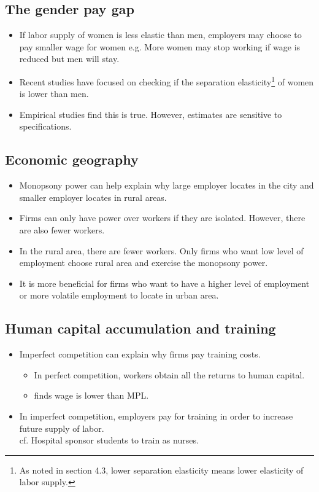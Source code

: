 \documentclass[a4paper, 12pt]{article}
\begin{document}
\subsection{The gender pay gap}
\begin{itemize}
\item If labor supply of women is less elastic than men, employers may choose to pay smaller wage for women e.g. More women may stop working if wage is reduced but men will stay.
\item Recent studies have focused on checking if the separation elasticity\footnote{As noted in section 4.3, lower separation elasticity means lower elasticity of labor supply.} of women is lower than men.
\item  Empirical studies find this is true. However, estimates are sensitive to specifications.
\end{itemize}
\subsection{Economic geography}
\begin{itemize}
\item Monopsony power can help explain why large employer locates in the city and smaller employer locates in rural areas.
\item Firms can only have power over workers if they are isolated. However, there are also fewer workers.
\item In the rural area, there are fewer workers. Only firms who want low level of employment choose rural area and exercise the monopsony power.
\item It is more beneficial for firms who want to  have a higher level of employment or more volatile employment to locate in urban area.
\end{itemize}
\subsection{Human capital accumulation and training}
\begin{itemize}
\item Imperfect competition can explain why firms pay training costs.
\begin{itemize}
\item In perfect competition, workers obtain all the returns to human capital.
\item \cite{acemoglu1997training} finds wage is lower than MPL.
\end{itemize}
\item In imperfect competition, employers pay for training in order to increase future supply of labor. \\
cf. \cite{benson2013firm} Hospital sponsor students to train as nurses.
\end{itemize}

 
\end{document}
